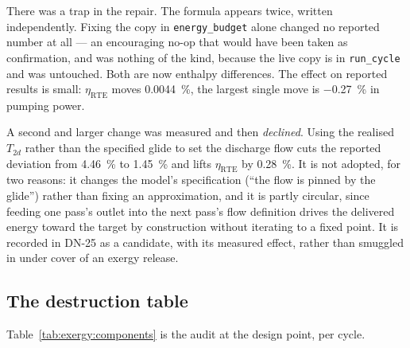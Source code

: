 There was a trap in the repair. The formula appears twice, written
independently. Fixing the copy in \texttt{energy\_budget} alone changed no
reported number at all --- an encouraging no-op that would have been taken as
confirmation, and was nothing of the kind, because the live copy is in
\texttt{run\_cycle} and was untouched. Both are now enthalpy differences. The
effect on reported results is small: $\eta_{\mathrm{RTE}}$ moves
\SI{+0.0044}{\percent}, the largest single move is \SI{-0.27}{\percent} in
pumping power.

A second and larger change was measured and then \emph{declined}. Using the
realised $T_{2d}$ rather than the specified glide to set the discharge flow
cuts the reported deviation from \SI{+4.46}{\percent} to
\SI{+1.45}{\percent} and lifts $\eta_{\mathrm{RTE}}$ by \SI{0.28}{\percent}.
It is not adopted, for two reasons: it changes the model's specification
(``the flow is pinned by the glide'') rather than fixing an approximation,
and it is partly circular, since feeding one pass's outlet into the next
pass's flow definition drives the delivered energy toward the target by
construction without iterating to a fixed point. It is recorded in DN-25 as a
candidate, with its measured effect, rather than smuggled in under cover of
an exergy release.

\subsection{The destruction table}
\label{sec:exergy:table}

Table~\ref{tab:exergy:components} is the audit at the design point, per cycle.

